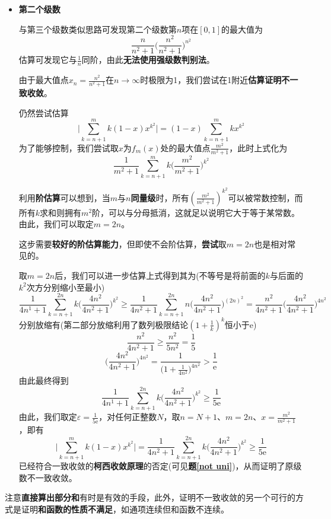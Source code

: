 \documentclass[a4paper,UTF8,fontset=windows,AutoFakeBold]{ctexart}
\newcommand*{\er}{\mathrm{e}}
\newcommand*{\note}{\noindent *}
\theoremstyle{ex}
\newcommand{\exref}[1]{\textbf{题\;\ref{#1}\;}}
\begin{document}
\begin{framed}
{\begin{itemize}
        \item \textbf{第二个级数}
        
        与第三个级数类似思路可发现第二个级数第$n$项在$[0,1]$的最大值为
        $$\frac{n}{n^2+1}\bigg(\frac{n^2}{n^2+1}\bigg)^{n^2}$$
        估算可发现它与$\frac{1}{n}$同阶，由此\textbf{无法使用强级数判别法}。

        由于最大值点$x_n=\frac{n^2}{n^2+1}$在$n\to\infty$时极限为1，我们尝试在1附近\textbf{估算证明不一致收敛}。

        仍然尝试估算
        $$\bigg|\sum_{k=n+1}^mk(1-x)x^{k^2}\bigg|=(1-x)\sum_{k=n+1}^mkx^{k^2}$$
        为了能够控制，我们尝试取$x$为$f_m(x)$处的最大值点$\frac{m^2}{m^2+1}$，此时上式化为
        $$\frac{1}{m^2+1}\sum_{k=n+1}^mk\bigg(\frac{m^2}{m^2+1}\bigg)^{k^2}$$
        
        利用\textbf{阶估算}可以想到，当$m$与$n$\textbf{同量级}时，所有$(\frac{m^2}{m^2+1})^{k^2}$可以被常数控制，而所有$k$求和则拥有$m^2$阶，可以与分母抵消，这就足以说明它大于等于某常数。由此，我们可以取定$m=2n$。

        \note 这步需要\textbf{较好的阶估算能力}，但即使不会阶估算，\textbf{尝试}取$m=2n$也是相对常见的。

        取$m=2n$后，我们可以进一步估算上式得到其为(不等号是将前面的$k$与后面的$k^2$次方分别缩小至最小)
        $$\frac{1}{4n^1+1}\sum_{k=n+1}^{2n}k\bigg(\frac{4n^2}{4n^2+1}\bigg)^{k^2}\ge\frac{1}{4n^2+1}\sum_{k=n+1}^{2n}n\bigg(\frac{4n^2}{4n^2+1}\bigg)^{(2n)^2}=\frac{n^2}{4n^2+1}\bigg(\frac{4n^2}{4n^2+1}\bigg)^{4n^2}$$
        分别放缩有(第二部分放缩利用了数列极限结论$(1+\frac{1}{k})^k$恒小于$\er$)
        $$\frac{n^2}{4n^2+1}\ge\frac{n^2}{5n^2}=\frac{1}{5}$$
        $$\bigg(\frac{4n^2}{4n^2+1}\bigg)^{4n^2}=\frac{1}{\big(1+\frac{1}{4n^2}\big)^{4n^2}}>\frac{1}{\er}$$
        由此最终得到
        $$\frac{1}{4n^1+1}\sum_{k=n+1}^{2n}k\bigg(\frac{4n^2}{4n^2+1}\bigg)^{k^2}\ge\frac{1}{5\er}$$
        由此，我们取定$\varepsilon=\frac{1}{5\er}$，对任何正整数$N$，取$n=N+1$、$m=2n$、$x=\frac{m^2}{m^2+1}$，即有
        $$\bigg|\sum_{k=n+1}^mk(1-x)x^{k^2}\bigg|=\frac{1}{4n^2+1}\sum_{k=n+1}^{2n}k\bigg(\frac{4n^2}{4n^2+1}\bigg)^{k^2}\ge\frac{1}{5\er}$$
        已经符合一致收敛的\textbf{柯西收敛原理}的否定(可见\exref{not uni})，从而证明了原级数不一致收敛。
    \end{itemize}
}
\end{framed}

\note 注意\textbf{直接算出部分和}有时是有效的手段，此外，证明不一致收敛的另一个可行的方式是证明\textbf{和函数的性质不满足}，如通项连续但和函数不连续。
\end{document}
